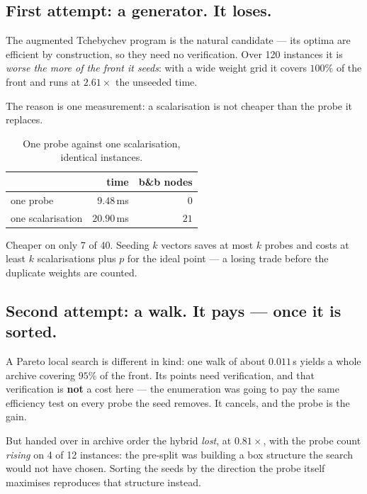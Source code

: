 \documentclass[11pt,a4paper]{article}
\begin{document}
\subsection{First attempt: a generator.  It loses.}

The augmented Tchebychev program is the natural candidate --- its optima are
efficient by construction, so they need no verification.  Over 120 instances it
is \emph{worse the more of the front it seeds}: with a wide weight grid it
covers $100\%$ of the front and runs at $2.61\times$ the unseeded time.

The reason is one measurement: a scalarisation is not cheaper than the probe it
replaces.

\begin{table}[h]
\centering
\caption{One probe against one scalarisation, identical instances.}
\begin{tabular}{lrr}
\toprule
 & time & b\&b nodes \\
\midrule
one probe         & $9.48$\,ms  & $0$ \\
one scalarisation & $20.90$\,ms & $21$ \\
\bottomrule
\end{tabular}
\end{table}

\noindent
Cheaper on only 7 of 40.  Seeding $k$ vectors saves at most $k$ probes and
costs at least $k$ scalarisations plus $p$ for the ideal point --- a losing
trade before the duplicate weights are counted.

\subsection{Second attempt: a walk.  It pays --- once it is sorted.}

A Pareto local search is different in kind: one walk of about $0.011$\,s yields
a whole archive covering $95\%$ of the front.  Its points need verification,
and that verification is \textbf{not} a cost here --- the enumeration was going
to pay the same efficiency test on every probe the seed removes.  It cancels,
and the probe is the gain.

But handed over in archive order the hybrid \emph{lost}, at $0.81\times$, with
the probe count \emph{rising} on 4 of 12 instances: the pre-split was building
a box structure the search would not have chosen.  Sorting the seeds by the
direction the probe itself maximises reproduces that structure instead.

\begin{center}
\end{center}
\end{document}
